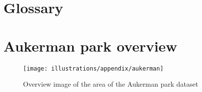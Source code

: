 \chapter{Glossary}\label{ch:glossary}

\begingroup
\renewcommand{\clearpage}{\relax}
\printglossary[type=\acronymtype]
\printglossary
\endgroup

\printbibliography[heading=bibnumbered, title={Bibliography}]

\appendix


\chapter{Aukerman park overview}\label{ch:aukerman-park-overview}

\begin{figure}[!ht]
    \centering
    \texttt{[image: illustrations/appendix/aukerman]}
    \caption{Overview image of the area of the Aukerman park dataset}
    \label{fig:appendix:aukerman-overview}
\end{figure}
